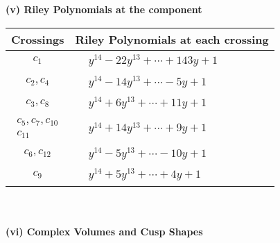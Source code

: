 \documentclass[1p]{elsarticle_modified}
\theoremstyle{definition}
\begin{document}
\newpage\renewcommand{\arraystretch}{1}
\flushleft \textbf{(v) Riley Polynomials at the component}\newline \\
\begin{tabular}{m{50pt}|m{274pt}}
Crossings & \hspace{64pt}Riley Polynomials at each crossing \\
\hline $$\begin{aligned}c_{1}\end{aligned}$$&$\begin{aligned}
&y^{14}-22 y^{13}+\cdots+143 y+1
\end{aligned}$\\
\hline $$\begin{aligned}c_{2},c_{4}\end{aligned}$$&$\begin{aligned}
&y^{14}-14 y^{13}+\cdots-5 y+1
\end{aligned}$\\
\hline $$\begin{aligned}c_{3},c_{8}\end{aligned}$$&$\begin{aligned}
&y^{14}+6 y^{13}+\cdots+11 y+1
\end{aligned}$\\
\hline $$\begin{aligned}c_{5},c_{7},c_{10}\\c_{11}\end{aligned}$$&$\begin{aligned}
&y^{14}+14 y^{13}+\cdots+9 y+1
\end{aligned}$\\
\hline $$\begin{aligned}c_{6},c_{12}\end{aligned}$$&$\begin{aligned}
&y^{14}-5 y^{13}+\cdots-10 y+1
\end{aligned}$\\
\hline $$\begin{aligned}c_{9}\end{aligned}$$&$\begin{aligned}
&y^{14}+5 y^{13}+\cdots+4 y+1
\end{aligned}$\\
\hline
\end{tabular}\\~\\
\newpage\flushleft \textbf{(vi) Complex Volumes and Cusp Shapes}
\end{document}
